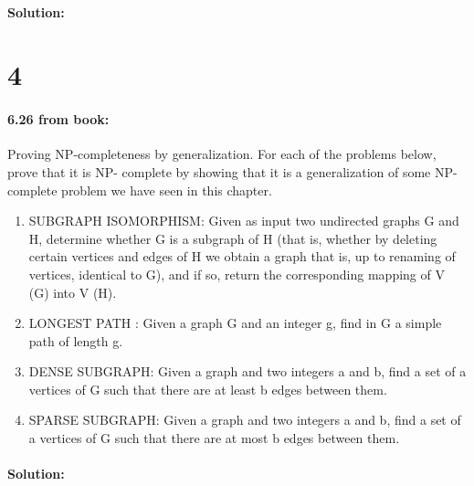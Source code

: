 \documentclass[12pt]{article}
\begin{document}
\paragraph{Solution:}

\section*{4}
\paragraph{6.26 from book:}
Proving NP-completeness by generalization. For each of the problems below, prove that it is NP-
complete by showing that it is a generalization of some NP-complete problem we have seen in
this chapter.
\begin{enumerate}
\item  SUBGRAPH ISOMORPHISM: Given as input two undirected graphs G and H, determine
        whether G is a subgraph of H (that is, whether by deleting certain vertices and edges of H
        we obtain a graph that is, up to renaming of vertices, identical to G), and if so, return the
        corresponding mapping of V (G) into V (H).

\item LONGEST PATH :
        Given a graph G and an integer g, find in G a simple path of length g.

\item  DENSE SUBGRAPH: Given a graph and two integers a and b, find a set of a vertices of G
        such that there are at least b edges between them.

\item SPARSE SUBGRAPH: Given a graph and two integers a and b, find a set of a vertices of G
        such that there are at most b edges between them.
\end{enumerate}

\paragraph{Solution:}
\end{document}
